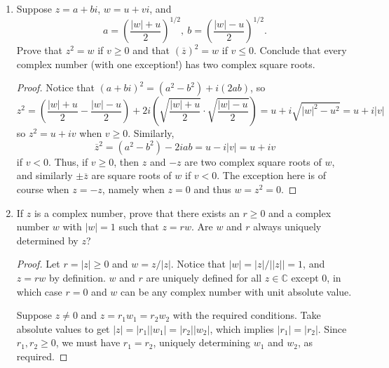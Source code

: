 \documentclass{scrbook}
\newcommand{\R}{\mathbb{R}}
\newcommand{\C}{\mathbb{C}}
\renewcommand{\bar}{\overline}
\begin{document}
\begin{enumerate}
\begin{proof}
This ordered set does not have the least-upper-bound property: consider the set $A = i\R = \{ir : r \in \R\}$, which is bounded above by $1$. We claim that though $A$ is non-empty and bounded above, there does not exist a least upper bound. Let $\alpha$ be an upper bound for $A$. Notice that $\alpha$ must have a non-negative real component. If $\alpha$ has a strictly positive real component, say $r$, then $r/2$ will be smaller than $r$ but still larger than all of $A$. Thus, a least upper bound will never have positive real component. If $\alpha$ had real component 0, then $\alpha + 1 \in A$ would be larger than it, a contradiction. Thus, no least upper bound for $A$ exists.
\end{proof}

\item Suppose $z = a + bi$, $w = u + vi$, and
\[
	a = \left(\frac{|w| + u}{2}\right)^{1/2},\ b = \left(\frac{|w| - u}{2}\right)^{1/2}.
\]
Prove that $z^2 = w$ if $v \ge 0$ and that $(\bar{z})^2 = w$ if $v \le 0$. Conclude that every complex number (with one exception!) has two complex square roots.

\begin{proof}
Notice that $(a + bi)^2 = (a^2 - b^2) + i(2ab)$, so
\[
	z^2 =  \left(\frac{|w| + u}{2} - \frac{|w| - u}{2} \right) + 2i \left( \sqrt{\frac{|w| + u}{2}} \cdot \sqrt{\frac{|w| - u}{2}} \right) = u + i \sqrt{|w|^2 - u^2} = u + i|v|
\]
so $z^2 = u + iv$ when $v \ge 0$. Similarly,
\[
	\bar{z}^2 = (a^2 - b^2) - 2iab = u - i|v| = u + iv
\]
if $v < 0$. Thus, if $v \ge 0$, then $z$ and $-z$ are two complex square roots of $w$, and similarly $\pm \bar{z}$ are square roots of $w$ if $v < 0$. The exception here is of course when $z = -z$, namely when $z = 0$ and thus $w = z^2 = 0$.
\end{proof}

\item If $z$ is a complex number, prove that there exists an $r \ge 0$ and a complex number $w$ with $|w| = 1$ such that $z = rw$. Are $w$ and $r$ always uniquely determined by $z$?

\begin{proof}
Let $r = |z| \ge 0$ and $w = z / |z|$. Notice that $|w| = |z| / ||z|| = 1$, and $z = rw$ by definition. $w$ and $r$ are uniquely defined for all $z \in \C$ except 0, in which case $r = 0$ and $w$ can be any complex number with unit absolute value.

Suppose $z \ne 0$ and $z = r_1 w_1 = r_2 w_2$ with the required conditions. Take absolute values to get $|z| = |r_1||w_1| = |r_2||w_2|$, which implies $|r_1| = |r_2|$. Since $r_1, r_2 \ge 0$, we must have $r_1 = r_2$, uniquely determining $w_1$ and $w_2$, as required.
\end{proof}


\end{enumerate}
\end{document}
